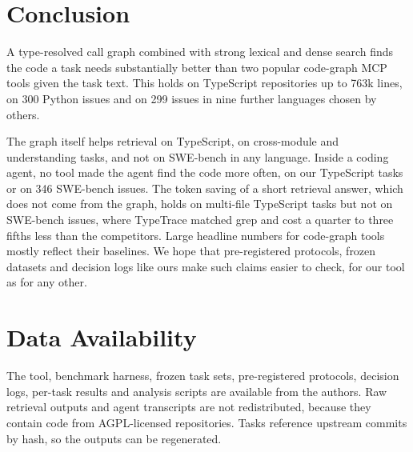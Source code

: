 \documentclass[sigconf,nonacm]{acmart}
\newcommand{\tool}{TypeTrace\xspace}
\begin{document}
\section{Conclusion}
A type-resolved call graph combined with strong lexical and dense search finds the code a task needs substantially better than two popular code-graph MCP tools given the task text. This holds on TypeScript repositories up to 763k lines, on 300 Python issues and on 299 issues in nine further languages chosen by others.

The graph itself helps retrieval on TypeScript, on cross-module and understanding tasks, and not on SWE-bench in any language. Inside a coding agent, no tool made the agent find the code more often, on our TypeScript tasks or on 346 SWE-bench issues. The token saving of a short retrieval answer, which does not come from the graph, holds on multi-file TypeScript tasks but not on SWE-bench issues, where \tool matched grep and cost a quarter to three fifths less than the competitors. Large headline numbers for code-graph tools mostly reflect their baselines. We hope that pre-registered protocols, frozen datasets and decision logs like ours make such claims easier to check, for our tool as for any other.

\section*{Data Availability}
The tool, benchmark harness, frozen task sets, pre-registered protocols, decision logs, per-task results and analysis scripts are available from the authors. Raw retrieval outputs and agent transcripts are not redistributed, because they contain code from AGPL-licensed repositories. Tasks reference upstream commits by hash, so the outputs can be regenerated.



\end{document}
